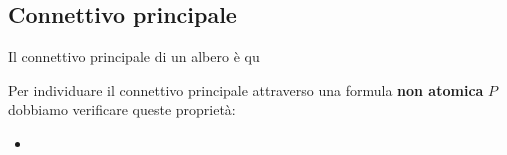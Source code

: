 \documentclass{article}
\begin{document}
\subsection{Connettivo principale}


Il connettivo principale di un albero è qu

Per individuare il connettivo principale attraverso una formula \textbf{non atomica} $P$ dobbiamo verificare queste proprietà:

\begin{itemize}
        \item  

\end{itemize}
\end{document}
